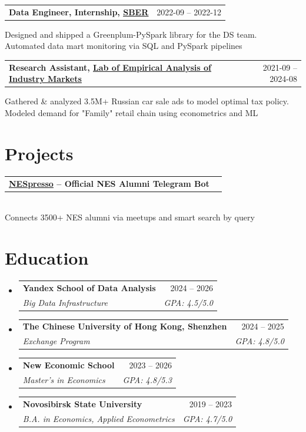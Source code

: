 \documentclass[letterpaper,11pt]{article}
\makeatletter
\newcommand{\resumeSubheading}[4]{
	\vspace{-2pt}\item
	\begin{tabular*}{0.97\textwidth}[t]{l@{\extracolsep{\fill}}r}
		\textbf{#1} & #2 \\
		\textit{\small#3} & \textit{\small #4} \\
	\end{tabular*}\vspace{-7pt}
}
\newcommand{\resumeProjectHeading}[2]{
	\item
	\begin{tabular*}{0.97\textwidth}{l@{\extracolsep{\fill}}r}
		\small#1 & #2 \\
	\end{tabular*}\vspace{-7pt}
}
\newcommand{\resumeSubHeadingListStart}{\begin{itemize}[leftmargin=0.15in, label={}]}
\newcommand{\resumeSubHeadingListEnd}{\end{itemize}}
\makeatother
\begin{document}
\resumeProjectHeading
{\textbf{Data Engineer, Internship,  \href{https://www.sberbank.com/index}{\underline{SBER}}}
	\vspace{8pt}}{2022-09 -- 2022-12}
{\small{Designed and shipped a Greenplum-PySpark library for the DS team. \\
Automated data mart monitoring via SQL and PySpark pipelines}}

\resumeProjectHeading
{\textbf{Research Assistant, \href{https://www.nsu.ru/n/media/news/obrazovanie/v-ngu-sozdana-novaya-laboratoriya-analiziruyushchaya-otraslevye-rynki/}{\underline{Lab of Empirical Analysis of Industry Markets}}}
	\vspace{8pt}}{2021-09 -- 2024-08}
{\small{Gathered \& analyzed 3.5M+ Russian car sale ads to model optimal tax policy. \\ Modeled demand for "Family" retail chain using econometrics and ML}}

\section{Projects}

\resumeProjectHeading
{\textbf{\href{https://t.me/NesRandomCoffeeBot}{\underline{NESpresso}} -- Official NES Alumni Telegram Bot} \vspace{8pt}}{}
{      \\
	\small{Connects 3500+ NES alumni via meetups and smart search by query}}

\section{Education}
\resumeSubHeadingListStart

\resumeSubheading
{Yandex School of Data Analysis}{2024 -- 2026}
{Big Data Infrastructure}{GPA: 4.5/5.0}

\resumeSubheading
{The Chinese University of Hong Kong, Shenzhen}{2024 -- 2025}
{Exchange Program}{GPA: 4.8/5.0}

\resumeSubheading
{New Economic School}{2023 -- 2026}
{Master's in Economics}{GPA: 4.8/5.3}

\resumeSubheading
{Novosibirsk State University}{2019 -- 2023}
{B.A. in Economics, Applied Econometrics}{GPA: 4.7/5.0}

\resumeSubHeadingListEnd
\end{document}
